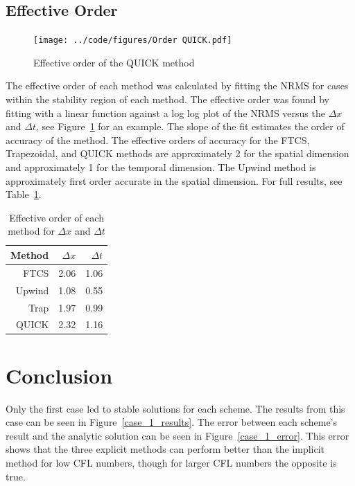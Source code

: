 \documentclass[twocolumn,10pt]{asme2ej}
\begin{document}
\subsection{Effective Order}
\begin{figure}[tb]
\begin{center}
\texttt{[image: ../code/figures/Order QUICK.pdf]}
\caption{Effective order of the QUICK method}
\label{QUICK_order}
\end{center}
\end{figure}
The effective order of each method was calculated by fitting the NRMS for cases within the stability region of each method. The effective order was found by fitting with a linear function against a log log plot of the NRMS versus the $\Delta x$ and $\Delta t$, see Figure~\ref{QUICK_order} for an example. The slope of the fit estimates the order of accuracy of the method. The effective orders of accuracy for the FTCS, Trapezoidal, and QUICK methods are approximately 2 for the spatial dimension and approximately 1 for the temporal dimension. The Upwind method is approximately first order accurate in the spatial dimension. For full results, see Table~\ref{effective_order_table}.

\begin{table}[tb]
\begin{center}
\begin{tabular}{|r | r | r |}
\hline
Method & $\Delta x$ & $\Delta t$ \\
\hline
FTCS    & 2.06 & 1.06 \\
Upwind  & 1.08 & 0.55 \\
Trap    & 1.97 & 0.99 \\
QUICK   & 2.32 & 1.16 \\
\hline
\end{tabular}
\caption{Effective order of each method for $\Delta x$ and $\Delta t$}
\label{effective_order_table}
\end{center}
\end{table}

\section{Conclusion}
Only the first case led to stable solutions for each scheme. The results from this case can be seen in Figure~\ref{case_1_results}. The error between each scheme's result and the analytic solution can be seen in Figure~\ref{case_1_error}. This error shows that the three explicit methods can perform better than the implicit method for low CFL numbers, though for larger CFL numbers the opposite is true.
\end{document}
